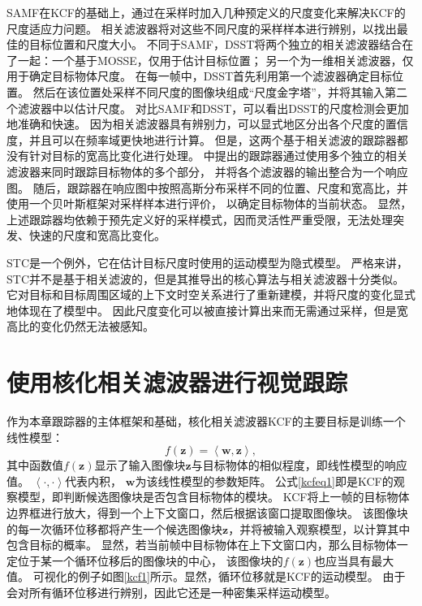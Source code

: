 SAMF在KCF的基础上，通过在采样时加入几种预定义的尺度变化来解决KCF的尺度适应力问题。
相关滤波器将对这些不同尺度的采样样本进行辨别，以找出最佳的目标位置和尺度大小。
不同于SAMF，DSST将两个独立的相关滤波器结合在了一起：一个基于MOSSE，仅用于估计目标位置；
另一个为一维相关滤波器，仅用于确定目标物体尺度。
在每一帧中，DSST首先利用第一个滤波器确定目标位置。
然后在该位置处采样不同尺度的图像块组成``尺度金字塔''，并将其输入第二个滤波器中以估计尺度。
对比SAMF和DSST，可以看出DSST的尺度检测会更加地准确和快速。
因为相关滤波器具有辨别力，可以显式地区分出各个尺度的置信度，并且可以在频率域更快地进行计算。
但是，这两个基于相关滤波的跟踪器都没有针对目标的宽高比变化进行处理。
\cite{pbcf}中提出的跟踪器通过使用多个独立的相关滤波器来同时跟踪目标物体的多个部分，
并将各个滤波器的输出整合为一个响应图。
随后，跟踪器在响应图中按照高斯分布采样不同的位置、尺度和宽高比，并使用一个贝叶斯框架对采样样本进行评价，
以确定目标物体的当前状态。
显然，上述跟踪器均依赖于预先定义好的采样模式，因而灵活性严重受限，无法处理突发、快速的尺度和宽高比变化。

STC是一个例外，它在估计目标尺度时使用的运动模型为隐式模型。
严格来讲，STC并不是基于相关滤波的，但是其推导出的核心算法与相关滤波器十分类似。
它对目标和目标周围区域的上下文时空关系进行了重新建模，并将尺度的变化显式地体现在了模型中。
因此尺度变化可以被直接计算出来而无需通过采样，但是宽高比的变化仍然无法被感知。

\section{使用核化相关滤波器进行视觉跟踪}
作为本章跟踪器的主体框架和基础，核化相关滤波器KCF的主要目标是训练一个线性模型：
\begin{equation}
f(\mathbf{z})=\left\langle\mathbf{w}, \mathbf{z}\right\rangle ,
\label{kcfeq1}
\end{equation}
其中函数值$f(\mathbf{z})$显示了输入图像块$\mathbf{z}$与目标物体的相似程度，即线性模型的响应值。
$\left\langle\cdot, \cdot\right\rangle$代表内积，
$\mathbf{w}$为该线性模型的参数矩阵。
公式\ref{kcfeq1}即是KCF的观察模型，即判断候选图像块是否包含目标物体的模块。
KCF将上一帧的目标物体边界框进行放大，得到一个上下文窗口，然后根据该窗口提取图像块。
该图像块的每一次循环位移都将产生一个候选图像块$\mathbf{z}$，并将被输入观察模型，以计算其中包含目标的概率。
显然，若当前帧中目标物体在上下文窗口内，那么目标物体一定位于某一个循环位移后的图像块的中心，
该图像块的$f(\mathbf{z})$也应当具有最大值。
可视化的例子如图\ref{kcf1}所示。显然，循环位移就是KCF的运动模型。
由于会对所有循环位移进行辨别，因此它还是一种密集采样运动模型。

